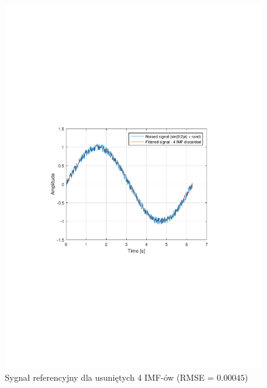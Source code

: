 \begin{figure}[!htb]
    \begin{center}
        \includegraphics[width=13cm,trim=3cm 9.2cm 4cm 10cm,clip]
        {../img/sin_rmse4.pdf}
    \end{center}
    \caption{Sygnał referencyjny dla usuniętych 4 IMF-ów (RMSE = $0.00045$)}
    \label{rys:sin_rmse4}
\end{figure}

